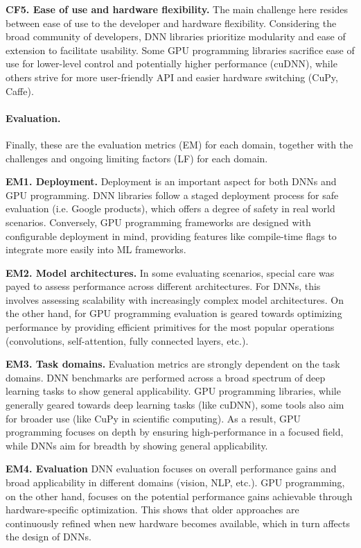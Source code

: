 \textbf{CF5. Ease of use and hardware flexibility.}
The main challenge here resides between ease of use to the developer and hardware flexibility.
Considering the broad community of developers, DNN libraries prioritize modularity and ease of
extension to facilitate usability. Some GPU programming libraries sacrifice ease of use for lower-level control
and potentially higher performance (cuDNN), while others strive for more user-friendly API and easier
hardware switching (CuPy, Caffe).
\paragraph{Evaluation.}
Finally, these are the evaluation metrics (EM) for each domain, together with the challenges and
ongoing limiting factors (LF) for each domain.

\textbf{EM1. Deployment.}
Deployment is an important aspect for both DNNs and GPU programming. DNN libraries follow a staged
deployment process for safe evaluation (i.e. Google products), which offers a degree of safety in
real world scenarios. Conversely, GPU programming frameworks are designed with configurable deployment
in mind, providing features like compile-time flags to integrate more easily into ML frameworks.

\textbf{EM2. Model architectures.}
In some evaluating scenarios, special care was payed to assess performance across different architectures.
For DNNs, this involves assessing scalability with increasingly complex model architectures. On the other hand,
for GPU programming evaluation is geared towards optimizing performance by providing efficient primitives
for the most popular operations (convolutions, self-attention, fully connected layers, etc.).

\textbf{EM3. Task domains.}
Evaluation metrics are strongly dependent on the task domains. DNN benchmarks are performed across
a broad spectrum of deep learning tasks to show general applicability. GPU programming libraries,
while generally geared towards deep learning tasks (like cuDNN), some tools also aim for broader
use (like CuPy in scientific computing). As a result, GPU programming focuses on depth by ensuring
high-performance in a focused field, while DNNs aim for breadth by showing general applicability.





\textbf{EM4. Evaluation}
DNN evaluation focuses on overall performance gains and broad applicability in different domains (vision,
NLP, etc.). GPU programming, on the other hand, focuses on the potential performance gains achievable through
hardware-specific optimization. This shows that older approaches are continuously refined when new hardware
becomes available, which in turn affects the design of DNNs.

